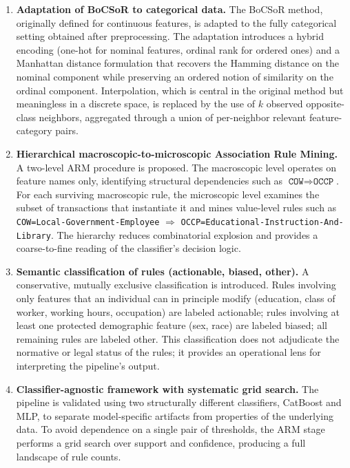 \begin{enumerate}
  \item \textbf{Adaptation of BoCSoR to categorical data.} The BoCSoR method, originally defined for continuous features, is adapted to the fully categorical setting obtained after preprocessing. The adaptation introduces a hybrid encoding (one-hot for nominal features, ordinal rank for ordered ones) and a Manhattan distance formulation that recovers the Hamming distance on the nominal component while preserving an ordered notion of similarity on the ordinal component. Interpolation, which is central in the original method but meaningless in a discrete space, is replaced by the use of $k$ observed opposite-class neighbors, aggregated through a union of per-neighbor relevant feature-category pairs.

  \item \textbf{Hierarchical macroscopic-to-microscopic Association Rule Mining.} A two-level ARM procedure is proposed. The macroscopic level operates on feature names only, identifying structural dependencies such as $\texttt{COW} \Rightarrow \texttt{OCCP}$. For each surviving macroscopic rule, the microscopic level examines the subset of transactions that instantiate it and mines value-level rules such as \texttt{COW=Local-Government-Employee} $\Rightarrow$ \texttt{OCCP=Educational-Instruction-And-Library}. The hierarchy reduces combinatorial explosion and provides a coarse-to-fine reading of the classifier's decision logic.

  \item \textbf{Semantic classification of rules (actionable, biased, other).} A conservative, mutually exclusive classification is introduced. Rules involving only features that an individual can in principle modify (education, class of worker, working hours, occupation) are labeled actionable; rules involving at least one protected demographic feature (sex, race) are labeled biased; all remaining rules are labeled other. This classification does not adjudicate the normative or legal status of the rules; it provides an operational lens for interpreting the pipeline's output.

  \item \textbf{Classifier-agnostic framework with systematic grid search.} The pipeline is validated using two structurally different classifiers, CatBoost and MLP, to separate model-specific artifacts from properties of the underlying data. To avoid dependence on a single pair of thresholds, the ARM stage performs a grid search over support and confidence, producing a full landscape of rule counts.


\end{enumerate}
